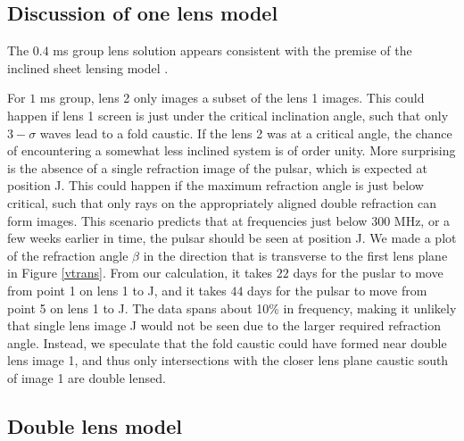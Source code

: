 \documentclass[useAMS,usenatbib]{mn2e}
\begin{document}


\subsection{Discussion of one lens model}

The $0.4$ ms group lens solution appears consistent with the premise of the inclined
sheet lensing model \citep{2014MNRAS.442.3338P}.

For $1$ ms group, lens 2
only images a subset of the lens 1 images.  This could happen if
lens 1 screen is just under the critical inclination
angle, such that only $3-\sigma$ waves lead to a fold caustic.  If the lens 2 was at a critical angle, the chance of encountering a
somewhat less inclined system is of order unity.
More surprising is the absence of a single refraction
image of the pulsar, which is expected at position J.  This could
happen if the maximum refraction angle is just below critical, such
that only rays on the appropriately aligned double refraction can form
images.  This scenario predicts that at frequencies just below $300$
MHz, or a few weeks earlier in time, the pulsar should be seen at
position J. We made a plot of the refraction angle $\beta$ in the
direction that is transverse to the first lens plane in Figure
\ref{vtrans}.  From our calculation, it takes $22$ days for the puslar
to move from point 1 on lens 1 to J, and it takes $44$ days
for the pulsar to move from point 5 on lens 1 to J.  The data
spans about 10\% in frequency, making it unlikely that single lens
image J would not be seen due to the larger required refraction
angle.  Instead, we speculate that the fold caustic could have formed
near double lens image 1, and thus only intersections with the closer
lens plane caustic south of image 1 are double lensed.

\subsection{Double lens model}
\label{doublelensmodel}
\end{document}
